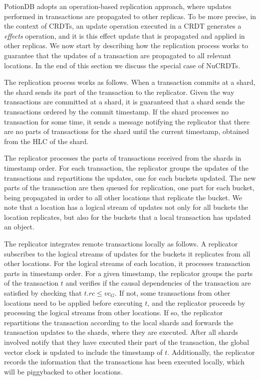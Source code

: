 \documentclass[sigconf, nonacm]{acmart}
\begin{document}
PotionDB adopts an operation-based replication approach, where updates performed in 
transactions are propagated to other replicas. To be more precise, in the context of CRDTs, an update
operation executed in a CRDT generates a \emph{effects} operation, and it is this effect update that is
propagated and applied in other replicas. We now start by describing how the replication process works to
guarantee that the updates of a transaction are propagated to all relevant locations. In the end of this section 
we discuss the special case of NuCRDTs.

The replication process works as follows. 
When a transaction commits at a shard, the shard sends its part of the transaction to the replicator.  
Given the way transactions are committed at a shard, it is guaranteed that a shard sends the transactions
ordered by the commit timestamp.
If the shard processes no transaction for some time, it sends a message notifying the replicator that there are
no parts of transactions for the shard until the current timestamp, obtained from the HLC of the shard.

The replicator processes the parts of transactions received from the shards in timestamp order. 
For each transaction, the replicator groups the updates of the transactions and repartitions the
updates, one for each buckets updated. The new parts of the transaction are then queued 
for replication, one part for each bucket, being propagated in order to all other locations that 
replicate the bucket. 
We note that a location has a logical stream of updates not only for all buckets the location replicates,
but also for the buckets that a local transaction has updated an object.


The replicator integrates remote transactions locally as follows.
A replicator subscribes to the logical streams of updates for the buckets it replicates from all other 
locations. For the logical streams of each location, it processes transaction parts in timestamp order.
For a given timestamp, the replicator groups the parts of the transaction $t$ and verifies if the causal dependencies 
of the transaction are satisfied by checking that $t.rc \leq \mathit{vc}_G$. If not, some transactions
from other locations need to be applied before executing $t$, and the replicator proceeds by processing
the logical streams from other locations. If so, the replicator repartitions the transaction according to
the local shards and forwards the transaction updates to the shards, where they are executed. 
After all shards involved notify that they have executed their part of the transaction,  the global
vector clock is updated to include the timestamp of $t$.
Additionally, the replicator records the information that the transactions has been executed locally,
which will be piggybacked to other locations.
\end{document}
